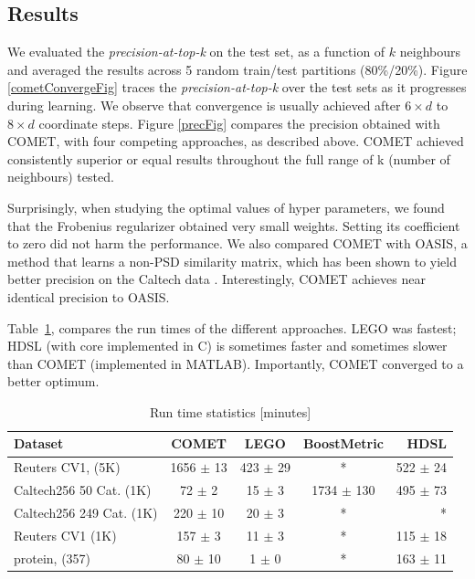 \documentclass{article} %
\newcommand{\tabref}[1]{Table~\ref{#1}}
\begin{document}
\subsection{Results}
 We evaluated the \textit{precision-at-top-k} on the test set, as a function of $k$ neighbours and averaged the results across 5 random train/test partitions (80\%/20\%).
Figure \ref{cometConvergeFig} traces the \textit{precision-at-top-k} over the test sets as it progresses during learning. We observe that convergence is usually achieved after $6\times d$ to $8 \times d$ coordinate steps.
Figure \ref{precFig} compares the precision obtained with COMET, with four competing approaches, as described above. COMET achieved consistently superior or equal results throughout the full range of k (number of neighbours) tested. 

Surprisingly, when studying the optimal values of hyper parameters, we found that the Frobenius regularizer obtained very small weights. Setting its coefficient to zero did not harm the performance. We also compared COMET with OASIS, a method that learns a non-PSD similarity matrix, which has been shown to yield better precision on the Caltech data \cite{OASIS}. Interestingly, COMET achieves near identical precision to OASIS. 

\tabref{runtimes}, compares the run times of the different approaches. LEGO was fastest; HDSL (with core implemented in C) is sometimes faster and sometimes slower than COMET (implemented in MATLAB). Importantly, COMET converged to a better optimum.

\begin{table}[t]
\caption{Run time statistics [minutes]}
\label{runtimes}
\vskip 0.15in
\begin{center}
\begin{small}
\begin{sc}
\begin{tabular}{lcccr}
\hline
Dataset     & COMET           & LEGO            & BoostMetric     & HDSL             \\ 
\hline
Reuters CV1, (5K)&  1656 $\pm$    13 &   423 $\pm$    29 &        *        &   522 $\pm$    24  \\ 
Caltech256 50 Cat. (1K)  &    72 $\pm$     2 &    15 $\pm$     3 &  1734 $\pm$    130&   495 $\pm$    73  \\ 
Caltech256 249 Cat. (1K) &   220 $\pm$    10 &    20 $\pm$     3 &        *        &        *        \\
Reuters CV1 (1K) &   157 $\pm$     3 &    11 $\pm$     3 &          *        &   115 $\pm$    18  \\ 
protein, (357)  &    80 $\pm$    10 &     1 $\pm$     0 &          *        &   163 $\pm$    11 \\ 
\hline
\end{tabular}
\end{sc}
\end{small}
\end{center}
\vskip -0.1in
\end{table}
\end{document}
